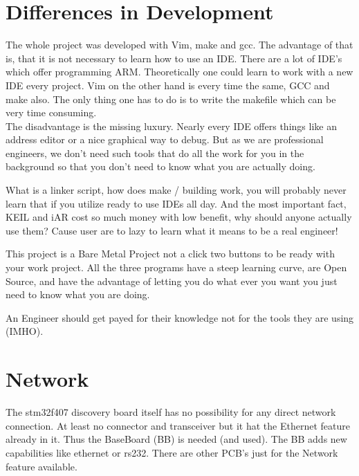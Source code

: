 \section{Differences in Development}
The whole project was developed with Vim, make and gcc.
 The advantage of that is, that it is not necessary to learn how to use an IDE.
 There are a lot of IDE's which offer programming ARM. Theoretically one could
learn to work with a new IDE every project. Vim on the other hand is every time
the same, GCC and make also. The only thing one has to do is to write the
 makefile which can be very time consuming.\\
The disadvantage is the missing luxury. Nearly every IDE offers things like an
address editor or a nice graphical way to debug.
But as we are professional engineers, we don't need such tools that do all the work for you in the background
so that you don't need to know what you are actually doing.

What is a linker script, how does make / building work,
you will probably never learn that if you utilize ready to use IDEs all day.
And the most important fact, KEIL and iAR cost so much money with low benefit, why should anyone actually use them?
Cause user are to lazy to learn what it means to be a real engineer!

This project is a Bare Metal Project not a click two buttons to be ready with your work project.
All the three programs have a steep learning curve, are Open Source,
and have the advantage of letting you do what ever you want you just need to know what you are doing.

An Engineer should get payed for their knowledge not for the tools they are using (IMHO).

\section{Network}
The stm32f407 discovery board itself has no possibility for any direct network connection.
At least no connector and transceiver but it hat the Ethernet feature already in it.
Thus the BaseBoard (BB) is needed (and used). The BB adds new capabilities like ethernet
or rs232.
There are other PCB's just for the Network feature available.
